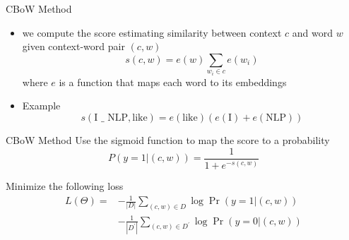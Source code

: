 \documentclass[12pt, handout]{beamer}
\begin{document}
\begin{frame}{CBoW Method}
	\begin{itemize}
		\item<4-> we compute the score estimating similarity between context $c$  and word $w$ given context-word pair $(c,w)$
		\begin{equation*}
		s(c,w) = e(w)\sum_{w_i \in c} e(w_i)
		\end{equation*}
		where $e$ is a function that maps each word to its embeddings
		\item Example
		\begin{equation*}
		s(\text{I }\_\text{ NLP},\text{like}) = e(\text{like})(e(\text{I})+e(\text{NLP}))
		\end{equation*}
	\end{itemize}
\end{frame}

\begin{frame}{CBoW Method}
Use the sigmoid function to map the score to a probability
\begin{equation*}
P(y=1|(c,w)) = \frac{1}{1+ e^{-s(c,w)}}
\end{equation*}
		
Minimize the following loss
\begin{equation*}
\begin{aligned}
L(\Theta) =  &-\frac{1}{|D|}\sum_{(c,w)\in D}\log \Pr(y=1|(c,w)) \\
&- \frac{1}{|D^\prime|}\sum_{(c,w)\in D^\prime}\log \Pr(y=0|(c,w))
\end{aligned}
\end{equation*}
\end{frame}
\end{document}
